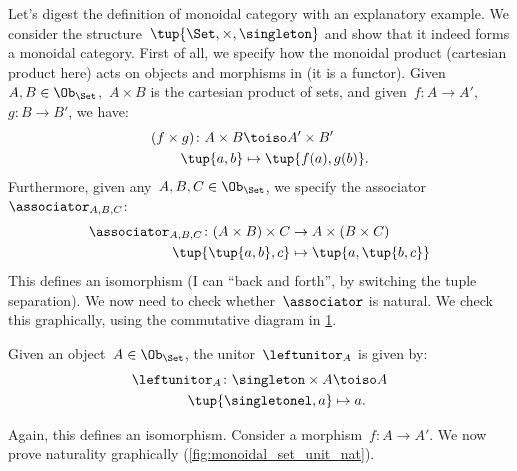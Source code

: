 \begin{example}
  Let's digest the definition of monoidal category with an explanatory example. We consider the structure~$\tup{\Set,\times,\singleton}$ and show that it indeed forms a monoidal category. First of all, we specify how the monoidal product (cartesian product here) acts on objects and morphisms in \Set (it is a functor). Given~$A,B\in \Ob_{\Set}$,~$A\times B$ is the cartesian product of sets, and given~$f\colon A\to A'$,~$g\colon B\to B'$, we have:
  \begin{equation*}
    \begin{aligned}
    (f\times g)
      \colon A\times B&\toiso A'\times B'\\
      \tup{a,b}&\mapsto \tup{f(a),g(b)}.
    \end{aligned}
  \end{equation*}
  Furthermore, given any~$A,B,C\in \Ob_{\Set}$, we specify the associator~$\associator_{A,B,C}$:
  \begin{equation*}
    \begin{aligned}
      \associator_{A,B,C}\colon (A\times B)\times C&\to A\times (B\times C)\\
      \tup{\tup{a,b},c}&\mapsto \tup{a,\tup{b,c}}
    \end{aligned}
  \end{equation*}
  This defines an isomorphism (I can ``back and forth'', by switching the tuple separation). We now need to check whether~$\associator$ is natural. We check this graphically, using the commutative diagram in \cref{fig:monoidal_set_ass_nat}.

  \begin{figure}[h!]
    \begin{center}
    \end{center}
    \caption{\label{fig:monoidal_set_ass_nat}}
  \end{figure}

  Given an object~$A\in \Ob_\Set$, the unitor~$\leftunitor_A$ is given by:
  \begin{equation*}
    \begin{aligned}
      \leftunitor_A\colon \singleton \times A &\toiso A\\
      \tup{\singletonel,a}&\mapsto a.
    \end{aligned}
  \end{equation*}

  Again, this defines an isomorphism. Consider a morphism~$f\colon A\to A'$. We now prove naturality graphically (\cref{fig:monoidal_set_unit_nat}).


\end{example}
